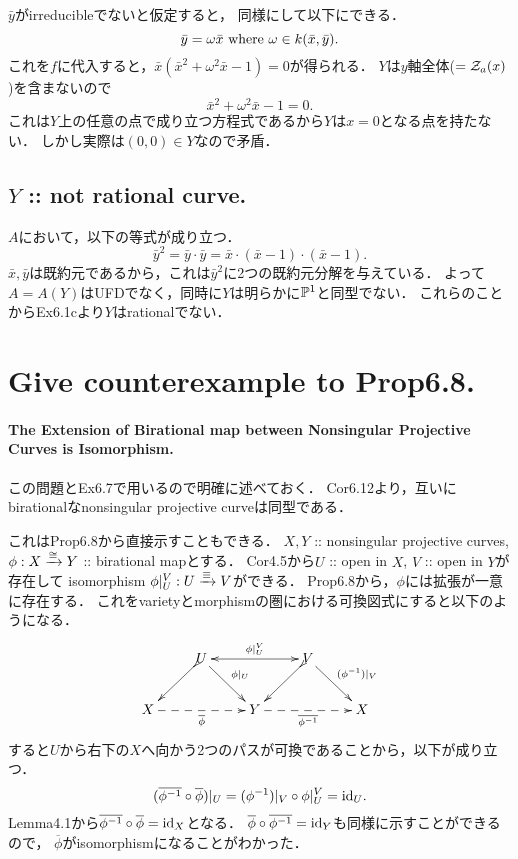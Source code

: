 \documentclass[a4paper]{jsarticle}
\begin{document}
    $\bar{y}$がirreducibleでないと仮定すると，
    同様にして以下にできる．
    \[ \bar{y}=\omega \bar{x} \text{ where } \omega \in k(\bar{x}, \bar{y}). \]
    これを$f$に代入すると，$\bar{x}(\bar{x}^2+\omega^2 \bar{x}-1)=0$が得られる．
    $Y$は$y$軸全体($=\mathcal{Z}_a(x)$)を含まないので
    \[ \bar{x}^2+\omega^2 \bar{x}-1=0. \]
    これは$Y$上の任意の点で成り立つ方程式であるから$Y$は$x=0$となる点を持たない．
    しかし実際は$(0,0) \in Y$なので矛盾．


    \subsection{$Y$ :: not rational curve.}
    $A$において，以下の等式が成り立つ．
    \[ \bar{y}^2=\bar{y} \cdot \bar{y}=\bar{x} \cdot (\bar{x}-1) \cdot (\bar{x}-1). \]
    $\bar{x}, \bar{y}$は既約元であるから，これは$\bar{y}^2$に2つの既約元分解を与えている．
    よって$A=A(Y)$はUFDでなく，同時に$Y$は明らかに$\mathbb{P}^1$と同型でない．
    これらのことからEx6.1cより$Y$はrationalでない．

\section{Give counterexample to Prop6.8.} %
    \paragraph{The Extension of Birational map between Nonsingular Projective Curves is Isomorphism.}
    この問題とEx6.7で用いるので明確に述べておく．
    Cor6.12より，互いにbirationalなnonsingular projective curveは同型である．

    これはProp6.8から直接示すこともできる．
    $X,Y$ :: nonsingular projective curves, $\phi: X \xrightarrow{\cong} Y$ :: birational mapとする．
    Cor4.5から$U$ :: open in $X$, $V$ :: open in $Y$が存在して
    isomorphism $\phi|_U^V: U \xrightarrow{\equiv} V$ができる．
    Prop6.8から，$\phi$には拡張が一意に存在する．
    これをvarietyとmorphismの圏における可換図式にすると以下のようになる．
    \[
    \xymatrix
    {
    {} & U \ar@{>->}[dl] \ar[dr]^-{\phi|_U} \ar@{<->}^-{\phi|_U^V}[rr] & {} & V \ar@{>->}[dl] \ar[dr]^-{(\phi^{-1})|_V} & {} \\
    X \ar@{-->}_-{\overline{\phi}}[rr] & {} & Y \ar@{-->}_-{\overline{\phi^{-1}}}[rr]& {} & X
    }
    \]
    すると$U$から右下の$X$へ向かう2つのパスが可換であることから，以下が成り立つ．
    \[ (\overline{\phi^{-1}} \circ \overline{\phi})|_U=(\phi^{-1})|_V \circ \phi|_U^V=\mathrm{id}_{U}. \]
    Lemma4.1から$\overline{\phi^{-1}} \circ \overline{\phi}=\mathrm{id}_{X}$となる．
    $\overline{\phi} \circ \overline{\phi^{-1}}=\mathrm{id}_{Y}$も同様に示すことができるので，
    $\overline{\phi}$がisomorphismになることがわかった．
\end{document}
